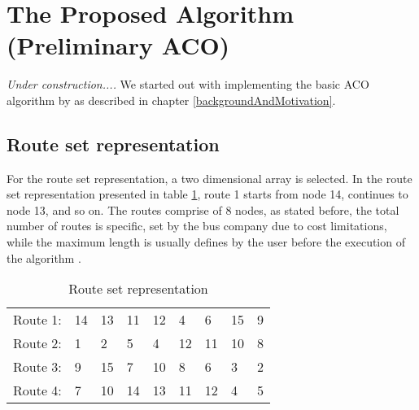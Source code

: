 \section{The Proposed Algorithm (Preliminary ACO) }

\textit{Under construction....}
\newline
We started out with implementing the basic ACO algorithm by \citet{nanda11} as described in chapter \ref{backgroundAndMotivation}.

\subsection{Route set representation}
For the route set representation, a two dimensional array is selected. In the route set representation presented in table \ref{table:routeSetRepr}, route 1 starts from node 14, continues to node 13, and so on. The routes comprise of 8 nodes, as stated before, the total number of routes is specific, set by the bus company due to cost limitations, while the maximum length is usually defines by the user before the execution of the algorithm \citep{kechagiopoulos14}.

\begin{table}[H]
    \begin{center}
        \begin{tabular}{|l| l l l l l l l l|}
      \hline
        Route 1: & 14 & 13 & 11 & 12 & 4 & 6 & 15 & 9 \\
        Route 2: & 1 & 2 & 5 & 4 & 12 & 11 & 10 & 8 \\
        Route 3: & 9 & 15 & 7 & 10 & 8 & 6 & 3 & 2 \\
        Route 4: & 7 & 10 & 14 & 13 & 11 & 12 & 4 & 5 \\
      \hline
        \end{tabular}
    \end{center}
    \caption {Route set representation}
    \label{table:routeSetRepr}
\end{table}

